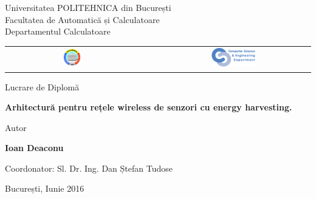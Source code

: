 


\pagestyle{empty}
\sffamily

\noindent
\begin{center}
	\Large
	Universitatea POLITEHNICA din București\\
	Facultatea de Automatică și Calculatoare\\
	Departamentul Calculatoare\\
	\begin{table}[h]
		\begin{center}
			\begin{tabular}{cccc}
				\includegraphics[width=0.13\textwidth]
				{img/upb.png}
				& & &
				\includegraphics[width=0.30\textwidth]
				{img/cs.png}
			\end{tabular}
		\end{center}
	\end{table}
\end{center}

\vfill\vfill
\begin{center}
	\Large
	Lucrare de Diplomă\\
\end{center}

\vfill
\begin{center}
	\HUGE\bfseries
	Arhitectură pentru rețele wireless de senzori cu energy harvesting.\\
	\vfill
	\large
\end{center}

\vfill
\begin{center}
	\Large
	Autor
\end{center}

\begin{center}
	\huge\bfseries
	Ioan Deaconu
\end{center}

\vfill\vfill\vfill
\begin{center}
	\Large
	Coordonator: Sl. Dr. Ing. Dan Ștefan Tudose\\
\end{center}

\vfill
\begin{center}
	\large
	București, Iunie 2016
\end{center}

\cleardoublepage

